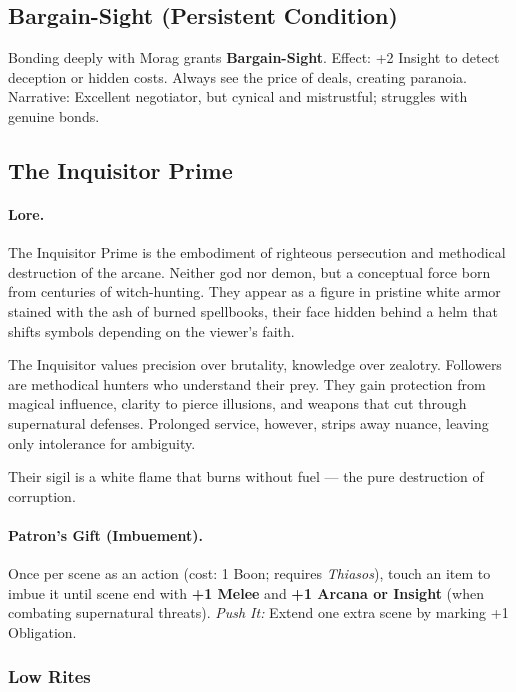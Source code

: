 \documentclass[11pt]{article}
\begin{document}
\subsection*{Bargain-Sight (Persistent Condition)}
Bonding deeply with Morag grants \textbf{Bargain-Sight}.  
Effect: +2 Insight to detect deception or hidden costs. Always see the price of deals, creating paranoia.  
Narrative: Excellent negotiator, but cynical and mistrustful; struggles with genuine bonds.
\clearpage

\subsection{The Inquisitor Prime}
\label{patron:inquisitor-prime}

\paragraph{Lore.}
The Inquisitor Prime is the embodiment of righteous persecution and methodical destruction of the arcane. Neither god nor demon, but a conceptual force born from centuries of witch-hunting. They appear as a figure in pristine white armor stained with the ash of burned spellbooks, their face hidden behind a helm that shifts symbols depending on the viewer's faith.

The Inquisitor values precision over brutality, knowledge over zealotry. Followers are methodical hunters who understand their prey. They gain protection from magical influence, clarity to pierce illusions, and weapons that cut through supernatural defenses. Prolonged service, however, strips away nuance, leaving only intolerance for ambiguity.

Their sigil is a white flame that burns without fuel --- the pure destruction of corruption.

\paragraph{Patron's Gift (Imbuement).}
Once per scene as an action (cost: 1 Boon; requires \emph{Thiasos}), touch an item to imbue it until scene end with \textbf{+1 Melee} and \textbf{+1 Arcana or Insight} (when combating supernatural threats).
\emph{Push It:} Extend one extra scene by marking +1 Obligation.

\subsubsection*{Low Rites}
\end{document}
